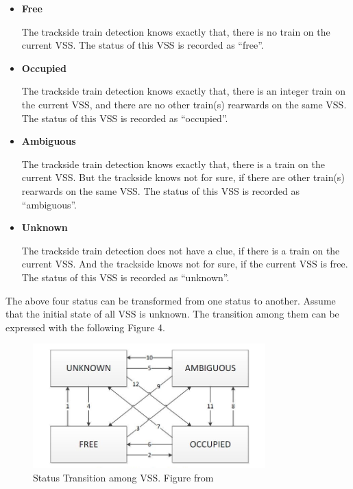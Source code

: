 \documentclass[article,dr=phil,type=msc,colorback,accentcolor=tud9c]{tudthesis}
\begin{document}
  \begin{itemize}
	
	\item \textbf{Free}
	
	The trackside train detection knows exactly that, there is no train on the current VSS. The status of this VSS is recorded as ``free''.
	
	\item \textbf{Occupied}
	
	The trackside train detection knows exactly that, there is an integer train on the current VSS, and there are no other train(s) rearwards on the same VSS. The status of this VSS is recorded as ``occupied''.
	
	\item \textbf{Ambiguous}
	
	The trackside train detection knows exactly that, there is a train on the current VSS. But the trackside knows not for sure, if there are other train(s) rearwards on the same VSS. The status of this VSS is recorded as ``ambiguous''.  
	
	\item \textbf{Unknown}  
	
	The trackside train detection does not have a clue, if there is a train on the current VSS. And the trackside knows not for sure, if the current VSS is free. The status of this VSS is recorded as ``unknown''.\cite{hybridl3}
	
  \end{itemize}

  The above four status can be transformed from one status to another. Assume that the initial state of all VSS is unknown. The transition among them can be expressed with the following Figure 4.

  \begin{figure}[H]
	\begin{center}
		\includegraphics[width=0.8\textwidth]{fig3}
		\caption[Caption for LOF]{Status Transition among VSS. Figure from \cite{hybridl3}}
	\end{center}
  \end{figure}
\end{document}
